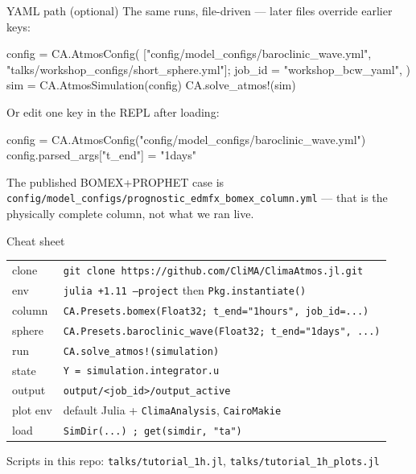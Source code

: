 \documentclass[aspectratio=169,11pt]{beamer}
\begin{document}
\begin{frame}[fragile]{YAML path (optional)}
The same runs, file-driven --- later files override earlier keys:
\vspace{0.3em}
\begin{semiverbatim}
config = CA.AtmosConfig(
    ["config/model_configs/baroclinic_wave.yml",
     "talks/workshop_configs/short_sphere.yml"];
    job_id = "workshop_bcw_yaml",
)
sim = CA.AtmosSimulation(config)
CA.solve_atmos!(sim)
\end{semiverbatim}
\vspace{0.3em}
Or edit one key in the REPL after loading:
\begin{semiverbatim}
config = CA.AtmosConfig("config/model_configs/baroclinic_wave.yml")
config.parsed_args["t_end"] = "1days"
\end{semiverbatim}
\small
The published BOMEX+PROPHET case is
\texttt{config/model\_configs/prognostic\_edmfx\_bomex\_column.yml} ---
that is the physically complete column, not what we ran live.
\end{frame}

\begin{frame}{Cheat sheet}
{\small
\begin{tabular}{@{}ll@{}}
  \toprule
  clone & \texttt{git clone https://github.com/CliMA/ClimaAtmos.jl.git} \\
  env & \texttt{julia +1.11 --project} then \texttt{Pkg.instantiate()} \\
  column & \texttt{CA.Presets.bomex(Float32; t\_end="1hours", job\_id=...)} \\
  sphere & \texttt{CA.Presets.baroclinic\_wave(Float32; t\_end="1days", ...)} \\
  run & \texttt{CA.solve\_atmos!(simulation)} \\
  state & \texttt{Y = simulation.integrator.u} \\
  output & \texttt{output/<job\_id>/output\_active} \\
  plot env & default Julia + \texttt{ClimaAnalysis}, \texttt{CairoMakie} \\
  load & \texttt{SimDir(...) ; get(simdir, "ta")} \\
  \bottomrule
\end{tabular}
}
\vspace{0.6em}
Scripts in this repo: \texttt{talks/tutorial\_1h.jl}, \texttt{talks/tutorial\_1h\_plots.jl}
\end{frame}
\end{document}
